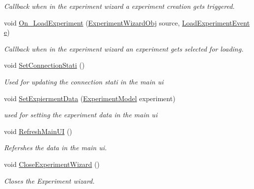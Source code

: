 \begin{DoxyCompactItemize}
\begin{DoxyCompactList}\small\item\em Callback when in the experiment wizard a experiment creation gets triggered. \end{DoxyCompactList}\item 
void \hyperlink{class_web_analyzer_1_1_controller_1_1_main_controller_abfc3aaeb8299f7890d08d7a150072b03}{On\+\_\+\+Load\+Experiment} (\hyperlink{class_web_analyzer_1_1_u_i_1_1_interaction_objects_1_1_experiment_wizard_obj}{Experiment\+Wizard\+Obj} source, \hyperlink{class_web_analyzer_1_1_events_1_1_load_experiment_event}{Load\+Experiment\+Event} \hyperlink{_u_i_2_h_t_m_l_resources_2js_2lib_2bootstrap_8min_8js_ab5902775854a8b8440bcd25e0fe1c120}{e})
\begin{DoxyCompactList}\small\item\em Callback when in the experiment wizard an experiment gets selected for loading. \end{DoxyCompactList}\item 
void \hyperlink{class_web_analyzer_1_1_controller_1_1_main_controller_af163fb2f694b612e5bf4a854f09b119f}{Set\+Connection\+Stati} ()
\begin{DoxyCompactList}\small\item\em Used for updating the connection stati in the main ui \end{DoxyCompactList}\item 
void \hyperlink{class_web_analyzer_1_1_controller_1_1_main_controller_a9834e917d2a61f4d5adb424ed76e0622}{Set\+Expierment\+Data} (\hyperlink{class_web_analyzer_1_1_models_1_1_base_1_1_experiment_model}{Experiment\+Model} experiment)
\begin{DoxyCompactList}\small\item\em used for setting the experiment data in the main ui \end{DoxyCompactList}\item 
void \hyperlink{class_web_analyzer_1_1_controller_1_1_main_controller_adaf2d5b304f6a713b9f08c9b4c7a6b62}{Refresh\+Main\+U\+I} ()
\begin{DoxyCompactList}\small\item\em Refershes the data in the main ui. \end{DoxyCompactList}\item 
void \hyperlink{class_web_analyzer_1_1_controller_1_1_main_controller_ab0958418a7186810e84795d022411b19}{Close\+Experiment\+Wizard} ()
\begin{DoxyCompactList}\small\item\em Closes the Experiment wizard. \end{DoxyCompactList}\item 

\end{DoxyCompactItemize}
